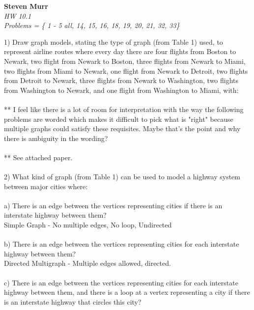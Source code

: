 \documentclass{article}
\begin{document}
\setcounter{totalnumber}{5}
   \begin{flushright}
      \Large\textbf{Steven Murr}\\
      \large\textit{HW 10.1} \\
      \large\textit{Problems = \{ 1 - 5 all, 14, 15, 16, 18, 19, 20, 21, 32, 33\} }
   \end{flushright}
\begin{flushleft}
\makeatletter%
\setlength{\@fptop}{5pt}
\makeatother
\setlength\parindent{0pt}1) Draw graph models, stating the type of graph (from Table 1) used, to represent airline routes where every day there are four flights from Boston to Newark, two flight from Newark to Boston, three flights from Newark to Miami, two flights from Miami to Newark, one flight from Newark to Detroit, two flights from Detroit to Newark, three flights from Newark to Washington, two flights from Washington to Newark, and one flight from Washington to Miami, with: \\
~\\
** I feel like there is a lot of room for interpretation with the way the following problems are worded which makes it difficult to pick what is "right" because multiple graphs could satisfy these requisites.  Maybe that's the point and why there is ambiguity in the wording?  \\
~\\
** See attached paper. \\
~\\
\setlength\parindent{0pt}2) What kind of graph (from Table 1) can be used to model a highway system between major cities where: \\
~\\
a) There is an edge between the vertices representing cities if there is an interstate highway between them? \\
Simple Graph - No multiple edges, No loop, Undirected \\
~\\
b) There is an edge between the vertices representing cities for each interstate highway between them? \\
Directed Multigraph - Multiple edges allowed, directed.\\
~\\
c) There is an edge between the vertices representing cities for each interstate highway between them, and there is a loop at a vertex representing a city if there is an interstate highway that circles this city? \\

\end{flushleft}
\end{document}
